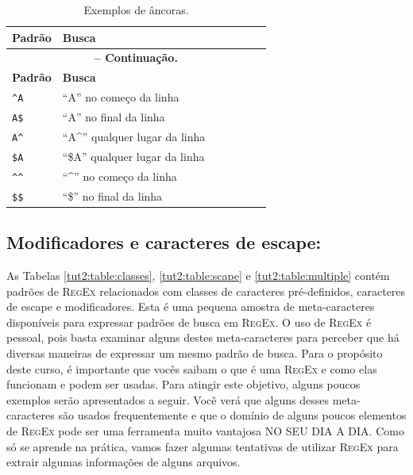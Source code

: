 \begin{refsection}
\begin{center}
\begin{longtable}{lllllll}
\caption[Tabela \ref{tut2:table:anchor}: Exemplos de âncoras]{Exemplos de âncoras.} \label{tut2:table:anchor} \\


\hline\hline \textbf{Padrão} & \textbf{Busca}\\
\endfirsthead

\multicolumn{6}{c}{{\bfseries \tablename\ \thetable{} -- Continuação.}}\\
\hline\hline \textbf{Padrão} & \textbf{Busca}\\
\endhead
\hline \hline
\endlastfoot
\texttt{\^{}A} & ``A'' no começo da linha\\
\texttt{A\$} & ``A'' no final da linha\\
\texttt{A\^{}} & ``A\^{}'' qualquer lugar da linha\\
\texttt{\$A} & ``\$A'' qualquer lugar da linha\\
\texttt{\^{}\^{}} & ``\^{}'' no começo da linha\\
\texttt{\$\$} & ``\$'' no final da linha\\

\end{longtable}
\end{center}


\subsection{Modificadores e caracteres de escape:}\label{tut2:regex:modifiers}

As Tabelas \ref{tut2:table:classes}, \ref{tut2:table:scape} e \ref{tut2:table:multiple} contém padrões de \textsc{RegEx} relacionados com classes de caracteres pré-definidos, caracteres de escape e modificadores. Esta é uma pequena amostra de meta-caracteres disponíveis para expressar padrões de busca em \textsc{RegEx}. O uso de \textsc{RegEx} é pessoal, pois basta examinar alguns destes meta-caracteres para perceber que há diversas maneiras de expressar um mesmo padrão de busca. Para o propósito deste curso, é importante que vocês saibam o que é uma \textsc{RegEx} e como elas funcionam e podem ser usadas. Para atingir este objetivo, alguns poucos exemplos serão apresentados a seguir. Você verá que alguns desses meta-caracteres são usados frequentemente e que o domínio de alguns poucos elementos de \textsc{RegEx} pode ser uma ferramenta muito vantajosa NO SEU DIA A DIA. Como só se aprende na prática, vamos fazer algumas tentativas de utilizar \textsc{RegEx} para extrair algumas informações de alguns arquivos.\\


\end{refsection}
